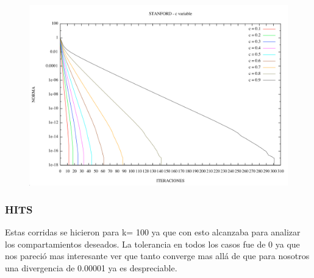 
\begin{figure}
\begin{center}
  \includegraphics[scale=0.5]{imagenes/pagerank_stanford_norma.png}
    \end{center}
\end{figure}



\FloatBarrier




\subsubsection {HITS}


Estas corridas se hicieron para k= 100 ya que con esto alcanzaba para analizar los compartamientos deseados. La tolerancia en todos los casos fue de 0 ya que nos pareció mas interesante ver que tanto converge mas allá de que para nosotros una divergencia de 0.00001 ya es despreciable.

